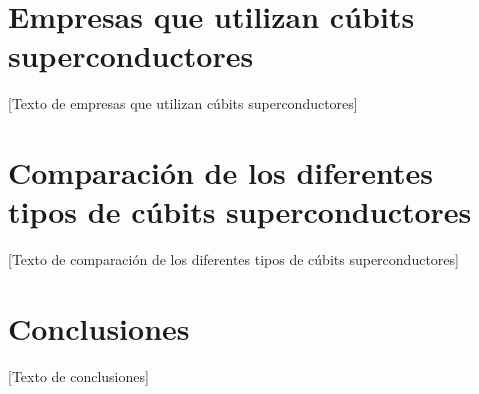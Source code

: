 \documentclass[12pt]{article}
\begin{document}
\section{Empresas que utilizan cúbits superconductores}

[Texto de empresas que utilizan cúbits superconductores]

\section{Comparación de los diferentes tipos de cúbits superconductores}

[Texto de comparación de los diferentes tipos de cúbits superconductores]

\section{Conclusiones}

[Texto de conclusiones]


\cite{barends_superconducting_2014}
\printbibliography
\end{document}
